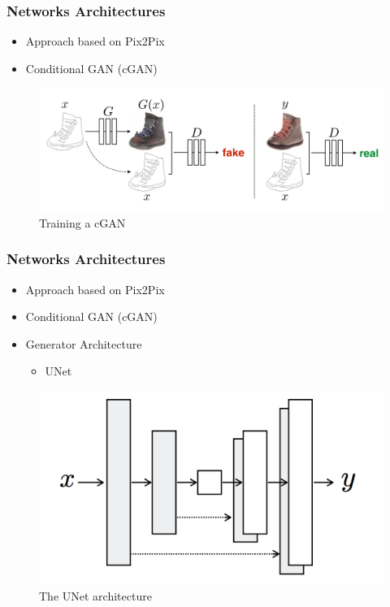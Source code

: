 \documentclass[18pt, xcolor=table]{beamer}
\begin{document}
\begin{frame}[t]
  \frametitle{Networks Architectures}
  \begin{itemize}
  \item Approach based on Pix2Pix
  \item Conditional GAN (cGAN)
  \end{itemize}
  \begin{center}
    \begin{figure}[htb]
      \includegraphics[scale=0.33]{images/pix2pix_cgan}
      \caption{Training a cGAN}
    \end{figure}
  \end{center}

\end{frame}


\begin{frame}[t]
  \frametitle{Networks Architectures}
  \begin{itemize}
  \item Approach based on Pix2Pix
  \item Conditional GAN (cGAN)
  \item Generator Architecture
    \begin{itemize}
    \item UNet
    \end{itemize}
  \end{itemize}

  \begin{center}
    \begin{figure}[htb]
      \includegraphics[scale=0.33]{images/nets/unet}
      \caption{The UNet architecture}
    \end{figure}
  \end{center}

\end{frame}
\end{document}

